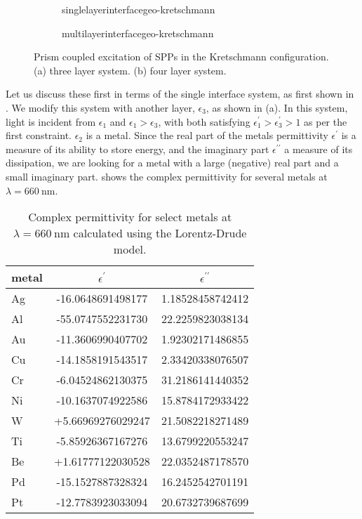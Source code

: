 \begin{figure}[ht]
 \centering
 \begin{subfigure}[b]{0.4\textwidth}
  \centering
  {singlelayerinterfacegeo-kretschmann}
 \end{subfigure}
 \begin{subfigure}[b]{0.4\textwidth}
  \centering
  {multilayerinterfacegeo-kretschmann}
 \end{subfigure}
\caption{Prism coupled excitation of SPPs in the Kretschmann configuration.  (a) three layer
system.  (b) four layer system. }
\label{fig:prismcoupledsetups}
\end{figure}
Let us discuss these first in terms of the single interface system, as
first shown in .  We modify this system with
another layer, $\epsilon_3$, as shown in
(a).  In this system, light is incident from
$\epsilon_1$ and $\epsilon_1>\epsilon_3$, with both satisfying
$\epsilon^\prime_1>\epsilon^\prime_3>1$ as per the first constraint.
$\epsilon_2$ is a metal.  Since the real part of the metals permittivity
$\epsilon^\prime$ is a measure of its ability to store energy, and the
imaginary part $\epsilon^{\prime\prime}$ a measure of its dissipation, we
are looking for a metal with a large (negative) real part and a small
imaginary part.   shows the complex permittivity for
several metals at $\lambda=\SI{660}{\nano\meter}$.

\begin{table}[ht]
\centering
{}
\begin{tabular}{lSS}
\toprule
metal & {$\epsilon^\prime$} & {$\epsilon^{\prime\prime}$} \\
\midrule
Ag & -16.0648691498177 & 1.18528458742412\\
Al & -55.0747552231730 & 22.2259823038134\\
Au & -11.3606990407702 & 1.92302171486855\\
Cu & -14.1858191543517 & 2.33420338076507\\
Cr & -6.04524862130375 & 31.2186141440352\\
Ni & -10.1637074922586 & 15.8784172933422\\
W  & +5.66969276029247 & 21.5082218271489\\
Ti & -5.85926367167276 & 13.6799220553247\\
Be & +1.61777122030528 & 22.0352487178570\\
Pd & -15.1527887328324 & 16.2452542701191\\
Pt & -12.7783923033094 & 20.6732739687699\\
\bottomrule
\end{tabular}
\caption{Complex permittivity for select metals at
$\lambda=\SI{660}{\nano\meter}$ calculated using the Lorentz-Drude model.}
\label{tbl:epsmetal600}
\end{table}


